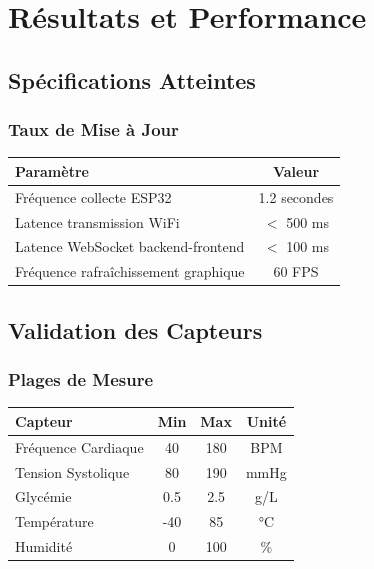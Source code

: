 \documentclass[12pt,french]{report}
\begin{document}
\chapter{Résultats et Performance}

\section{Spécifications Atteintes}

\subsection{Taux de Mise à Jour}

\begin{table}[h]
\centering
\begin{tabular}{|l|c|}
\hline
\textbf{Paramètre} & \textbf{Valeur} \\
\hline
Fréquence collecte ESP32 & 1.2 secondes \\
Latence transmission WiFi & $<$ 500 ms \\
Latence WebSocket backend-frontend & $<$ 100 ms \\
Fréquence rafraîchissement graphique & 60 FPS \\
\hline
\end{tabular}
\end{table}

\section{Validation des Capteurs}

\subsection{Plages de Mesure}

\begin{table}[h]
\centering
\begin{tabular}{|l|c|c|c|}
\hline
\textbf{Capteur} & \textbf{Min} & \textbf{Max} & \textbf{Unité} \\
\hline
Fréquence Cardiaque & 40 & 180 & BPM \\
Tension Systolique & 80 & 190 & mmHg \\
Glycémie & 0.5 & 2.5 & g/L \\
Température & -40 & 85 & °C \\
Humidité & 0 & 100 & \% \\
\hline
\end{tabular}
\end{table}
\end{document}
